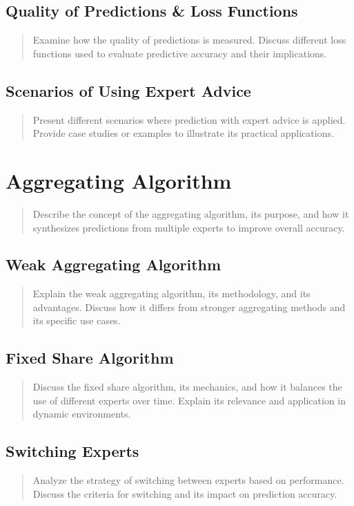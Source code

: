\documentclass[11pt]{article} %
\theoremstyle{plain}
\theoremstyle{definition}
\begin{document}
\subsection{Quality of Predictions \& Loss Functions}
\begin{quote}
  Examine how the quality of predictions is measured. Discuss different loss functions used to evaluate predictive accuracy and their implications.
\end{quote}

\subsection{Scenarios of Using Expert Advice}
\begin{quote}
  Present different scenarios where prediction with expert advice is applied. Provide case studies or examples to illustrate its practical applications.
\end{quote}

\newpage

\section{Aggregating Algorithm}
\begin{quote}
  Describe the concept of the aggregating algorithm, its purpose, and how it synthesizes predictions from multiple experts to improve overall accuracy.
\end{quote}

\subsection{Weak Aggregating Algorithm}
\begin{quote}
  Explain the weak aggregating algorithm, its methodology, and its advantages. Discuss how it differs from stronger aggregating methods and its specific use cases.
\end{quote}

\subsection{Fixed Share Algorithm}
\begin{quote}
  Discuss the fixed share algorithm, its mechanics, and how it balances the use of different experts over time. Explain its relevance and application in dynamic environments.
\end{quote}

\subsection{Switching Experts}
\begin{quote}
  Analyze the strategy of switching between experts based on performance. Discuss the criteria for switching and its impact on prediction accuracy.
\end{quote}
\end{document}
